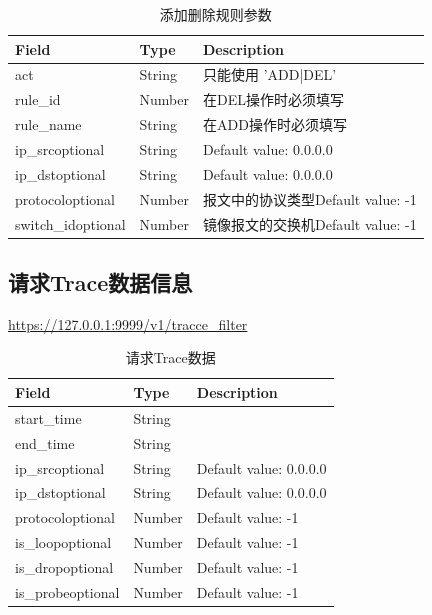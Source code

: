 \begin{table}[]
    \centering
    \caption{添加删除规则参数}
    \label{tbl:add_del_rule}
    \begin{tabular}{lll} \hline
    Field              & Type   & Description                 \\ \hline
    act                & String & 只能使用 'ADD|DEL'              \\
    rule\_id           & Number & 在DEL操作时必须填写                 \\
    rule\_name         & String & 在ADD操作时必须填写                 \\
    ip\_srcoptional    & String & Default value: 0.0.0.0      \\
    ip\_dstoptional    & String & Default value: 0.0.0.0      \\
    protocoloptional   & Number & 报文中的协议类型Default value: -1   \\
    switch\_idoptional & Number & 镜像报文的交换机Default value: -1 \\ \hline
    \end{tabular}
\end{table}

\subsection{请求Trace数据信息}

\url{https://127.0.0.1:9999/v1/tracce_filter}

\begin{table}[]
    \centering
    \caption{请求Trace数据}
    \label{tbl:get_trace}
    \begin{tabular}{lll} \hline
    Field             & Type   & Description            \\ \hline
    start\_time       & String &                        \\
    end\_time         & String &                        \\
    ip\_srcoptional   & String & Default value: 0.0.0.0 \\
    ip\_dstoptional   & String & Default value: 0.0.0.0 \\
    protocoloptional  & Number & Default value: -1      \\
    is\_loopoptional  & Number & Default value: -1      \\
    is\_dropoptional  & Number & Default value: -1      \\
    is\_probeoptional & Number & Default value: -1      \\ \hline
    \end{tabular}
\end{table}

